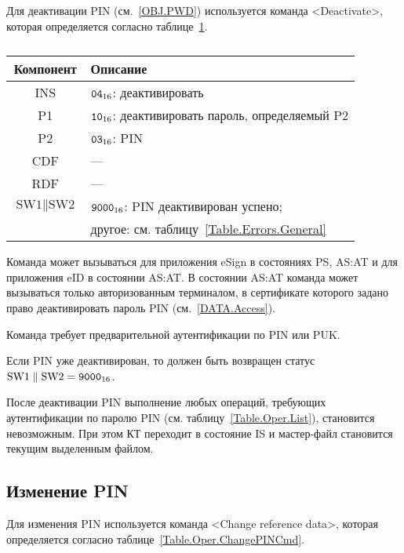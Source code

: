 Для деактивации PIN (см.~\ref{OBJ.PWD}) 
используется команда <Deactivate>, 
которая определяется согласно 
таблице~\ref{Table.Oper.DeactivatePINCmd}.

\begin{table}[hbt]
\caption{}\label{Table.Oper.DeactivatePINCmd}
\begin{tabular}{|c|p{14cm}|}
\hline
Компонент & Описание \\
\hline
\hline
INS & $\texttt{04}_{16}$: деактивировать \\
\hline
P1 & $\texttt{10}_{16}$: деактивировать пароль, определяемый P2\\
\hline
P2 & $\texttt{03}_{16}$: PIN \\
\hline
CDF &  --- \\
\hline 
RDF & --- \\
\hline
$\text{SW1} \parallel \text{SW2}$ & 
$\texttt{9000}_{16}$: PIN деактивирован успено; \\
  & другое: см. таблицу~\ref{Table.Errors.General}\\
\hline
\end{tabular}
\end{table}

Команда может вызываться для приложения eSign в состояниях 
PS, AS:AT и для приложения eID в состоянии AS:AT. 
В состоянии AS:AT команда может вызываться 
только авторизованным терминалом,
в сертификате которого задано право деактивировать пароль PIN
(см.~\ref{DATA.Access}).

Команда требует предварительной аутентификации по PIN или PUK. 

Если PIN уже деактивирован, то должен быть возвращен 
статус $\text{SW1} \parallel \text{SW2} = \texttt{9000}_{16}$.

После деактивации PIN выполнение любых операций, 
требующих аутентификации по паролю PIN (см. таблицу~\ref{Table.Oper.List}), 
становится невозможным. 
При этом КТ переходит в состояние IS и мастер-файл 
становится текущим выделенным файлом. 


\subsection{Изменение PIN}
\label{Oper.Descr.ChangePIN}

Для изменения PIN используется команда <Change reference data>,
которая определяется согласно 
таблице~\ref{Table.Oper.ChangePINCmd}.


